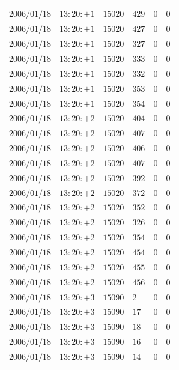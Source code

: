 \documentclass[a4j,papersize,disablejfam,slide,14pt]{jsarticle}
\begin{document}
\begin{description}
\begin{center}
\begin{longtable}{|l|l|l|l|l|l|}
					$2006/01/18$ & $13:20:+1$  & $15020$ & $429$ & $0$ & $0$ \\ \hline
					$2006/01/18$ & $13:20:+1$  & $15020$ & $427$ & $0$ & $0$ \\ \hline
					$2006/01/18$ & $13:20:+1$  & $15020$ & $327$ & $0$ & $0$ \\ \hline
					$2006/01/18$ & $13:20:+1$  & $15020$ & $333$ & $0$ & $0$ \\ \hline
					$2006/01/18$ & $13:20:+1$  & $15020$ & $332$ & $0$ & $0$ \\ \hline
					$2006/01/18$ & $13:20:+1$  & $15020$ & $353$ & $0$ & $0$ \\ \hline
					$2006/01/18$ & $13:20:+1$  & $15020$ & $354$ & $0$ & $0$ \\ \hline
					$2006/01/18$ & $13:20:+2$  & $15020$ & $404$ & $0$ & $0$ \\ \hline
					$2006/01/18$ & $13:20:+2$  & $15020$ & $407$ & $0$ & $0$ \\ \hline
					$2006/01/18$ & $13:20:+2$  & $15020$ & $406$ & $0$ & $0$ \\ \hline
					$2006/01/18$ & $13:20:+2$  & $15020$ & $407$ & $0$ & $0$ \\ \hline
					$2006/01/18$ & $13:20:+2$  & $15020$ & $392$ & $0$ & $0$ \\ \hline
					$2006/01/18$ & $13:20:+2$  & $15020$ & $372$ & $0$ & $0$ \\ \hline
					$2006/01/18$ & $13:20:+2$  & $15020$ & $352$ & $0$ & $0$ \\ \hline
					$2006/01/18$ & $13:20:+2$  & $15020$ & $326$ & $0$ & $0$ \\ \hline
					$2006/01/18$ & $13:20:+2$  & $15020$ & $354$ & $0$ & $0$ \\ \hline
					$2006/01/18$ & $13:20:+2$  & $15020$ & $454$ & $0$ & $0$ \\ \hline
					$2006/01/18$ & $13:20:+2$  & $15020$ & $455$ & $0$ & $0$ \\ \hline
					$2006/01/18$ & $13:20:+2$  & $15020$ & $456$ & $0$ & $0$ \\ \hline
					$2006/01/18$ & $13:20:+3$  & $15090$ & $2$ & $0$ & $0$ \\ \hline
					$2006/01/18$ & $13:20:+3$  & $15090$ & $17$ & $0$ & $0$ \\ \hline
					$2006/01/18$ & $13:20:+3$  & $15090$ & $18$ & $0$ & $0$ \\ \hline
					$2006/01/18$ & $13:20:+3$  & $15090$ & $16$ & $0$ & $0$ \\ \hline
					$2006/01/18$ & $13:20:+3$  & $15090$ & $14$ & $0$ & $0$ \\ \hline

\end{longtable}
\end{center}
\end{description}
\end{document}
